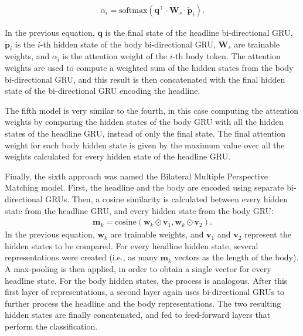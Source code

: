 \begin{equation}
\begin{split}
\alpha_i = \mathrm{softmax}(\boldsymbol{q}^\top \cdot \boldsymbol{W}_s \cdot \widetilde{\boldsymbol{p}}_i).
\label{eq:attentivereader}
\end{split}
\end{equation}

In the previous equation, $\boldsymbol{q}$ is the final state of the headline bi-directional GRU, $\widetilde{\boldsymbol{p}}_i$ is the $i$-th hidden state of the body bi-directional GRU, $\boldsymbol{W}_s$ are trainable weights, and $\alpha_i$ is the attention weight of the $i$-th body token. The attention weights are used to compute a weighted sum of the hidden states from the body bi-directional GRU, and this result is then concatenated with the final hidden state of the bi-directional GRU encoding the headline.

The fifth model is very similar to the fourth, in this case computing the attention weights by comparing the hidden states of the body GRU with all the hidden states of the headline GRU, instead of only the final state. The final attention weight for each body hidden state is given by the maximum value over all the weights calculated for every hidden state of the headline GRU.

Finally, the sixth approach was named the Bilateral Multiple Perspective Matching model. First, the headline and the body are encoded using separate bi-directional GRUs. Then, a cosine similarity is calculated between every hidden state from the headline GRU, and every hidden state from the body GRU:
\begin{equation}
\begin{split}
\boldsymbol{m}_k = \mathrm{cosine}(\boldsymbol{w}_k \odot \boldsymbol{v}_1, \boldsymbol{w}_k \odot \boldsymbol{v}_2).
\label{eq:cosinesim}
\end{split}
\end{equation}
In the previous equation, $\boldsymbol{w}_k$ are trainable weights, and $\boldsymbol{v}_1$ and $\boldsymbol{v}_2$ represent the hidden states to be compared. For every headline hidden state, several representations were created (i.e., as many $\boldsymbol{m}_k$ vectors as the length of the body). A max-pooling is then applied, in order to obtain a single vector for every headline state. For the body hidden states, the process is analogous. After this first layer of representations, a second layer again uses bi-directional GRUs to further process the headline and the body representations. The two resulting hidden states are finally concatenated, and fed to feed-forward layers that perform the classification.

